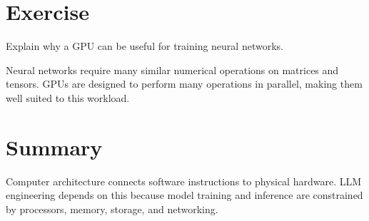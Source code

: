 \section{Exercise}
\begin{exercise}Explain why a GPU can be useful for training neural networks.\end{exercise}
\begin{solution}Neural networks require many similar numerical operations on matrices and tensors. GPUs are designed to perform many operations in parallel, making them well suited to this workload.\end{solution}

\section{Summary}
Computer architecture connects software instructions to physical hardware. LLM engineering depends on this because model training and inference are constrained by processors, memory, storage, and networking.
